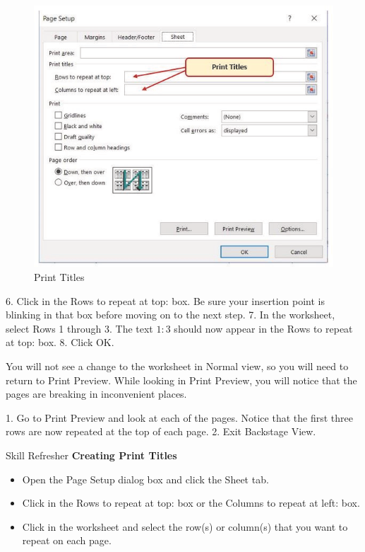 \begin{figure}[H]
	\centering
	\includegraphics[width=\maxwidth{.95\linewidth}]{gfx/ch03_fig29}
	\caption{Print Titles}
	\label{03:fig29}
\end{figure}



6. Click in the Rows to repeat at top: box. Be sure your insertion point is blinking in that box before
moving on to the next step.
7. In the worksheet, select Rows 1 through 3. The text $1:$3 should now appear in the Rows to
repeat at top: box.
8. Click OK.

You will not see a change to the worksheet in Normal view, so you will need to return to Print
Preview. While looking in Print Preview, you will notice that the pages are breaking in inconvenient
places.

1. Go to Print Preview and look at each of the pages. Notice that the first three rows are now
repeated at the top of each page.
2. Exit Backstage View.

\begin{center}
	\begin{sklbox}{Skill Refresher}
		\textbf{Creating Print Titles}
		\\
		\begin{itemize}
			\setlength{\itemsep}{0pt}
			\setlength{\parskip}{0pt}
			\setlength{\parsep}{0pt}

			\item Open the Page Setup dialog box and click the Sheet tab.
			\item Click in the Rows to repeat at top: box or the Columns to repeat at left: box.
			\item Click in the worksheet and select the row(s) or column(s) that you want to repeat on each page.
						
		\end{itemize}
	\end{sklbox}
\end{center}


